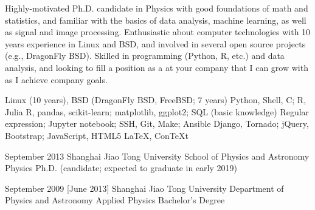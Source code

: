 \documentclass{resume}
\begin{document}
\makeheader

Highly-motivated Ph.D. candidate in Physics with good foundations of math
and statistics, and familiar with the basics of data analysis, machine
learning, as well as signal and image processing.
Enthusiastic about computer technologies with 10 years experience
in Linux and BSD, and involved in several open source projects (e.g.,
DragonFly BSD).
Skilled in programming (Python, R, etc.) and data analysis,
and looking to fill a position as a \textbf{\getposition}
at your company that I can grow with as I achieve company goals.

\begin{competences}[10em]
    {Linux (10 years), BSD (DragonFly BSD, FreeBSD; 7 years)}
    {Python, Shell, C; R, Julia}
    {R, pandas, scikit-learn; matplotlib, ggplot2; SQL (basic knowledge)}
    {Regular expression; Jupyter notebook; SSH, Git, Make; Ansible}
    {Django, Tornado; jQuery, Bootstrap; JavaScript, HTML5}
    {\LaTeX, Con\TeX{}t}
\end{competences}

\begin{educations}
  \education%
    {September 2013}%
    {Shanghai Jiao Tong University}%
    {School of Physics and Astronomy}%
    {Physics}%
    {Ph.D. (candidate; expected to graduate in early 2019)}

  \separator{0.5em}
  \education%
    {September 2009}%
    [June 2013]%
    {Shanghai Jiao Tong University}%
    {Department of Physics and Astronomy}%
    {Applied Physics}%
    {Bachelor's Degree}
\end{educations}
\end{document}
